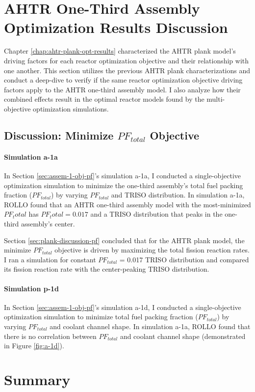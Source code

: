 \section{AHTR One-Third Assembly Optimization Results Discussion}
\label{sec:assem-discussion}
Chapter \ref{chap:ahtr-plank-opt-results} characterized the \gls{AHTR} plank model's 
driving factors for each reactor optimization objective and their relationship with 
one another. 
This section utilizes the previous \gls{AHTR} plank characterizations and conduct 
a deep-dive to verify if the same reactor optimization objective driving factors apply 
to the \gls{AHTR} one-third assembly model. 
I also analyze how their combined effects result in the optimal reactor models found by 
the multi-objective optimization simulations. 

\subsection{Discussion: Minimize $PF_{total}$ Objective}
\label{sec:assem-discussion-pf}
\paragraph{Simulation a-1a}
In Section \ref{sec:assem-1-obj-pf}'s simulation a-1a, I conducted a single-objective 
optimization simulation to minimize the one-third assembly's total fuel packing fraction 
($PF_{total}$) by varying $PF_{total}$ and TRISO distribution. 
In simulation a-1a, \gls{ROLLO} found that an \gls{AHTR} one-third assembly model with 
the most-minimized $PF_total$ has $PF_total= 0.017$ and a TRISO distribution that peaks 
in the one-third assembly's center. 

Section \ref{sec:plank-discussion-pf} concluded that for the \gls{AHTR} plank model, 
the minimize $PF_{total}$ objective is driven by maximizing the total fission reaction 
rates. 
I ran a simulation for constant $PF_{total}$ = 0.017 TRISO distribution and compared its 
fission reaction rate with the center-peaking TRISO distribution. 

\paragraph{Simulation p-1d}
In Section \ref{sec:assem-1-obj-pf}'s simulation a-1d, I conducted a single-objective 
optimization simulation to minimize total fuel packing fraction ($PF_{total}$) by 
varying $PF_{total}$ and coolant channel shape. 
In simulation a-1a, \gls{ROLLO} found that there is no correlation 
between $PF_{total}$ and coolant channel shape (demonstrated in Figure 
\ref{fig:a-1d}). 

\section{Summary}


